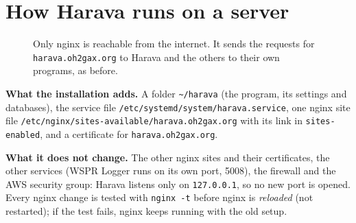 \documentclass[10pt,a4paper]{article}
\newcommand{\lead}[1]{\textbf{#1}\enspace}
\begin{document}
\section{How Harava runs on a server}\label{sec:how}

\begin{figure}[H]\centering
{}
\caption{Only nginx is reachable from the internet. It sends the requests for \texttt{harava.oh2gax.org} to Harava and the others to their own programs, as before.}
\end{figure}

\lead{What the installation adds.} A folder \texttt{\textasciitilde/harava} (the program, its settings and databases), the service file \nolinkurl{/etc/systemd/system/harava.service}, one nginx site file \nolinkurl{/etc/nginx/sites-available/harava.oh2gax.org} with its link in \texttt{sites-enabled}, and a certificate for \texttt{harava.oh2gax.org}.

\lead{What it does not change.} The other nginx sites and their certificates, the other services (WSPR Logger runs on its own port, 5008), the firewall and the AWS security group: Harava listens only on \texttt{127.0.0.1}, so no new port is opened. Every nginx change is tested with \texttt{nginx -t} before nginx is \emph{reloaded} (not restarted); if the test fails, nginx keeps running with the old setup.
\end{document}

